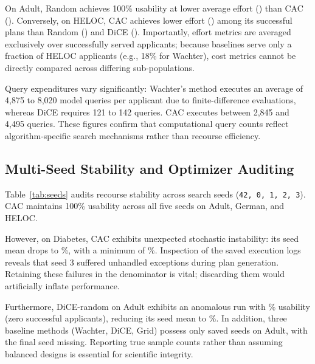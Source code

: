 \documentclass[nolineno]{paper/ieee-access/ieeeaccess}%
\newcommand{\CAC}{CAC}
\newcommand{\artifact}[1]{\nolinkurl{#1}}
\begin{document}
On Adult, Random achieves 100\% usability at lower average effort (\AdultRandomCost{}) than \CAC{} (\AdultCacCost{}). Conversely, on HELOC, \CAC{} achieves lower effort (\HelocCacCost{}) among its successful plans than Random (\HelocRandomCost{}) and DiCE (\HelocDiceCost{}). Importantly, effort metrics are averaged exclusively over successfully served applicants; because baselines serve only a fraction of HELOC applicants (e.g., 18\% for Wachter), cost metrics cannot be directly compared across differing sub-populations.

Query expenditures vary significantly: Wachter's method executes an average of 4,875 to 8,020 model queries per applicant due to finite-difference evaluations, whereas DiCE requires 121 to 142 queries. \CAC{} executes between 2,845 and 4,495 queries. These figures confirm that computational query counts reflect algorithm-specific search mechanisms rather than recourse efficiency.

\subsection{Multi-Seed Stability and Optimizer Auditing}
Table~\ref{tab:seeds} audits recourse stability across \CacSeeds{} search seeds (\artifact{42, 0, 1, 2, 3}). \CAC{} maintains 100\% usability across all five seeds on Adult, German, and HELOC.

However, on Diabetes, \CAC{} exhibits unexpected stochastic instability: its seed mean drops to \DiabetesCacSeedMean\%, with a minimum of \DiabetesCacSeedMin\%. Inspection of the saved execution logs reveals that seed 3 suffered \DiabetesCacSeedFailures{} unhandled exceptions during plan generation. Retaining these failures in the denominator is vital; discarding them would artificially inflate performance.

Furthermore, DiCE-random on Adult exhibits an anomalous run with \AdultDiceSeedMin\% usability (zero successful applicants), reducing its seed mean to \AdultDiceSeedMean\%. In addition, three baseline methods (Wachter, DiCE, Grid) possess only \AdultDiceSeedCount{} saved seeds on Adult, with the final seed missing. Reporting true sample counts rather than assuming balanced designs is essential for scientific integrity.

\begin{table}[t]
\caption{Usability across saved search runs: mean [minimum, maximum] in
percent, followed by the run count in parentheses. Models and applicants
stay the same across seeds. The ranges describe these search runs, not
confidence intervals for results on new applicants.}
\label{tab:seeds}
\centering\footnotesize

\end{table}
\end{document}

